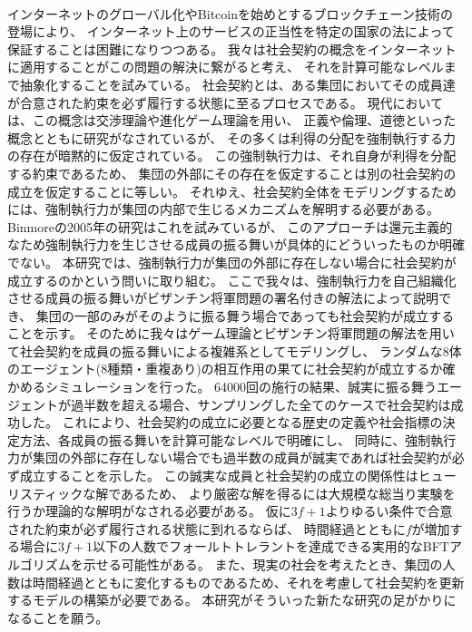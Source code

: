 ~ \\
  インターネットのグローバル化やBitcoin\cite{nakamoto2008bitcoin}を始めとするブロックチェーン技術の登場により、
  インターネット上のサービスの正当性を特定の国家の法によって保証することは困難になりつつある。
  我々は社会契約の概念をインターネットに適用することがこの問題の解決に繋がると考え、
  それを計算可能なレベルまで抽象化することを試みている。
  社会契約とは、ある集団においてその成員達が合意された約束を必ず履行する状態に至るプロセスである。
  現代においては、この概念は交渉理論や進化ゲーム理論を用い、
  正義や倫理、道徳といった概念とともに研究がなされている\cite{sep-game-ethics}が、
  その多くは利得の分配を強制執行する力の存在が暗黙的に仮定されている。
  この強制執行力は、それ自身が利得を分配する約束であるため、
  集団の外部にその存在を仮定することは別の社会契約の成立を仮定することに等しい。
  それゆえ、社会契約全体をモデリングするためには、強制執行力が集団の内部で生じるメカニズムを解明する必要がある。
  Binmoreの2005年の研究\cite{binmore2005}はこれを試みているが、
  このアプローチは還元主義的なため強制執行力を生じさせる成員の振る舞いが具体的にどういったものか明確でない。
  本研究では、強制執行力が集団の外部に存在しない場合に社会契約が成立するのかという問いに取り組む。
  ここで我々は、強制執行力を自己組織化させる成員の振る舞いがビザンチン将軍問題の署名付きの解法\cite{lamport1982}によって説明でき、
  集団の一部のみがそのように振る舞う場合であっても社会契約が成立することを示す。
  そのために我々はゲーム理論とビザンチン将軍問題の解法を用いて社会契約を成員の振る舞いによる複雑系としてモデリングし、
  ランダムな8体のエージェント(8種類・重複あり)の相互作用の果てに社会契約が成立するか確かめるシミュレーションを行った。
  64000回の施行の結果、誠実に振る舞うエージェントが過半数を超える場合、サンプリングした全てのケースで社会契約は成功した。
  これにより、社会契約の成立に必要となる歴史の定義や社会指標の決定方法、各成員の振る舞いを計算可能なレベルで明確にし、
  同時に、強制執行力が集団の外部に存在しない場合でも過半数の成員が誠実であれば社会契約が必ず成立することを示した。
  この誠実な成員と社会契約の成立の関係性はヒューリスティックな解であるため、
  より厳密な解を得るには大規模な総当り実験を行うか理論的な解明がなされる必要がある。
  仮に$3f+1$よりゆるい条件で合意された約束が必ず履行される状態に到れるならば、
  時間経過とともに$f$が増加する場合に$3f+1$以下の人数でフォールトトレラントを達成できる実用的なBFTアルゴリズムを示せる可能性がある。
  また、現実の社会を考えたとき、集団の人数は時間経過とともに変化するものであるため、それを考慮して社会契約を更新するモデルの構築が必要である。
  本研究がそういった新たな研究の足がかりになることを願う。
~ \\